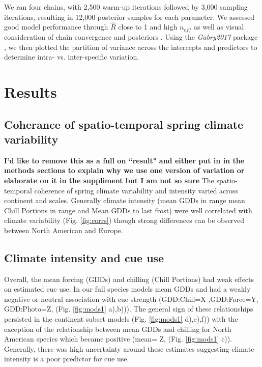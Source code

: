 \documentclass[12pt]{article}\usepackage[]{graphicx}\usepackage[]{color}
\begin{document}
We ran four chains, with 2,500 warm-up iterations followed by 3,000 sampling iterations, resulting in 12,000 posterior samples for each parameter. We assessed good model performance through $\hat{R}$ close to 1 and high $n_{eff}$ as well as visual consideration of chain convergence and posteriors \citep{Gelman2006}. Using the \textit{Gabry2017} package \citep{bayesplot}, we then plotted the partition of variance across the intercepts and predictors to determine intra- vs. inter-specific variation.  



\section*{Results}

\subsection*{Coherance of spatio-temporal spring climate variability}
\textbf{I'd like to remove this as a full on ``result" and either put in in the methods sections to explain why we use one version of variation or elaborate on it in the suppliment but I am not so sure}
The spatio-temporal coherence of spring climate variability and intensity varied across continent and scales. Generally climate intensity (mean GDDs in range mean Chill Portions in range and Mean GDDs to last frost) were well correlated with climate variability (Fig. \ref{fig:corrs}) though strong differences can be observed between North American and Europe.  %

\subsection*{Climate intensity and cue use}
Overall, the mean forcing (GDDs) and chilling (Chill Portions) had weak effects on estimated cue use. 
In our full species models mean GDDs and had a weakly negative or neutral association with cue strength (GDD:Chill=X ,GDD:Force=Y, GDD:Photo=Z, (Fig. \ref{fig:mods1} a),b))). The general sign of these relationships persisted in the continent subset models (Fig. \ref{fig:mods1} d),e),f)) with the exception of the relationship between mean GDDs and chilling for North American species which became positive (mean= Z, (Fig. \ref{fig:mods1} c)). Generally, there was high uncertainty around these estimates suggesting climate intensity is a poor predictor for cue use. 
\end{document}
